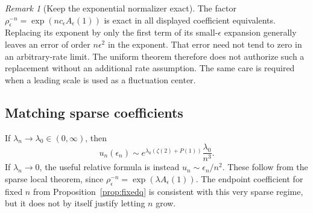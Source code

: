 \documentclass[11pt,a4paper]{article}
\numberwithin{equation}{section}
\theoremstyle{definition}
\theoremstyle{remark}
\newtheorem{remark}[theorem]{Remark}
\newcommand{\ee}{\epsilon}
\begin{document}
\begin{remark}[Keep the exponential normalizer exact]
The factor $\rho_\ee^{-n}=\exp(nc_\ee A_\ee(1))$ is exact in all displayed
coefficient equivalents. Replacing its exponent by only the first term of
its small-$\ee$ expansion generally leaves an error of order $n\ee^2$
in the exponent. That error need not tend to zero in an arbitrary-rate
limit. The uniform theorem therefore does not authorize such a replacement
without an additional rate assumption. The same care is required when a
leading scale is used as a fluctuation center.
\end{remark}

\subsection{Matching sparse coefficients}
If $\lambda_n\to\lambda_0\in(0,\infty)$, then
\begin{equation}\label{eq:sparsecoefficient}
 u_n(\ee_n)\sim
 e^{\lambda_0(\zeta(2)+P(1))}\frac{\lambda_0}{n^3}.
\end{equation}
If $\lambda_n\to0$, the useful relative formula is instead
$u_n\sim\ee_n/n^2$. These follow from the sparse local theorem, since
$\rho_\ee^{-n}=\exp(\lambda A_\ee(1))$.
The endpoint coefficient for fixed $n$ from Proposition~\ref{prop:fixedq}
is consistent with this very sparse regime, but it does not by itself
justify letting $n$ grow.
\end{document}
